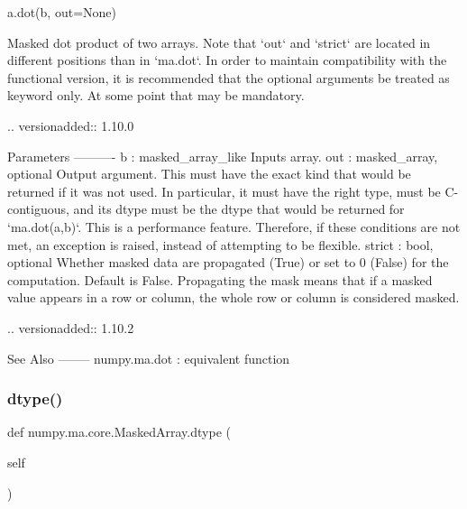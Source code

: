 \begin{DoxyVerb}a.dot(b, out=None)

Masked dot product of two arrays. Note that `out` and `strict` are
located in different positions than in `ma.dot`. In order to
maintain compatibility with the functional version, it is
recommended that the optional arguments be treated as keyword only.
At some point that may be mandatory.

.. versionadded:: 1.10.0

Parameters
----------
b : masked_array_like
    Inputs array.
out : masked_array, optional
    Output argument. This must have the exact kind that would be
    returned if it was not used. In particular, it must have the
    right type, must be C-contiguous, and its dtype must be the
    dtype that would be returned for `ma.dot(a,b)`. This is a
    performance feature. Therefore, if these conditions are not
    met, an exception is raised, instead of attempting to be
    flexible.
strict : bool, optional
    Whether masked data are propagated (True) or set to 0 (False)
    for the computation. Default is False.  Propagating the mask
    means that if a masked value appears in a row or column, the
    whole row or column is considered masked.

    .. versionadded:: 1.10.2

See Also
--------
numpy.ma.dot : equivalent function\end{DoxyVerb}
 \mbox{\label{classnumpy_1_1ma_1_1core_1_1MaskedArray_a62214235f0aab03fccf5cb2988601eba}} 
\subsubsection{\texorpdfstring{dtype()}{dtype()}\hspace{0.1cm}{\footnotesize\ttfamily [1/2]}}
{\footnotesize\ttfamily def numpy.\+ma.\+core.\+Masked\+Array.\+dtype (\begin{DoxyParamCaption}\item[{}]{self }\end{DoxyParamCaption})}

\mbox{\label{classnumpy_1_1ma_1_1core_1_1MaskedArray_a31dbda994edd5cd739b52fbcf857b7c2}} 
